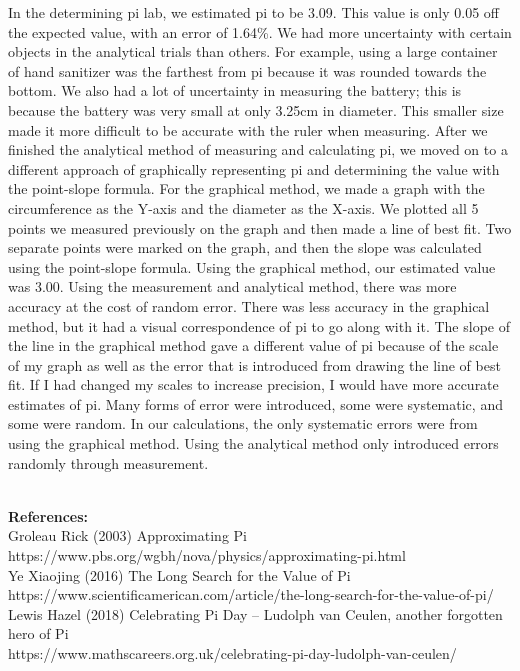 \documentclass[12pt]{article}
\begin{document}
\hspace{4mm} In the determining pi lab, we estimated pi to be 3.09. This value is only 0.05 off the expected value, with an error of 1.64\%. We had more uncertainty with certain objects in the analytical trials than others. For example, using a large container of hand sanitizer was the farthest from pi because it was rounded towards the bottom. We also had a lot of uncertainty in measuring the battery; this is because the battery was very small at only 3.25cm in diameter. This smaller size made it more difficult to be accurate with the ruler when measuring. After we finished the analytical method of measuring and calculating pi, we moved on to a different approach of graphically representing pi and determining the value with the point-slope formula. For the graphical method, we made a graph with the circumference as the Y-axis and the diameter as the X-axis. We plotted all 5 points we measured previously on the graph and then made a line of best fit. Two separate points were marked on the graph, and then the slope was calculated using the point-slope formula. Using the graphical method, our estimated value was 3.00. Using the measurement and analytical method, there was more accuracy at the cost of random error. There was less accuracy in the graphical method, but it had a visual correspondence of pi to go along with it. The slope of the line in the graphical method gave a different value of pi because of the scale of my graph as well as the error that is introduced from drawing the line of best fit. If I had changed my scales to increase precision, I would have more accurate estimates of pi. Many forms of error were introduced, some were systematic, and some were random. In our calculations, the only systematic errors were from using the graphical method. Using the analytical method only introduced errors randomly through measurement. \\ \\

\pagebreak

\textbf{References:} \\
Groleau Rick (2003) Approximating Pi \\
https://www.pbs.org/wgbh/nova/physics/approximating-pi.html \\

\noindent Ye Xiaojing (2016) The Long Search for the Value of Pi \\
https://www.scientificamerican.com/article/the-long-search-for-the-value-of-pi/ \\

\noindent Lewis Hazel (2018) Celebrating Pi Day – Ludolph van Ceulen, another forgotten hero of Pi \\
https://www.mathscareers.org.uk/celebrating-pi-day-ludolph-van-ceulen/ \\



    
    
    
\end{document}
